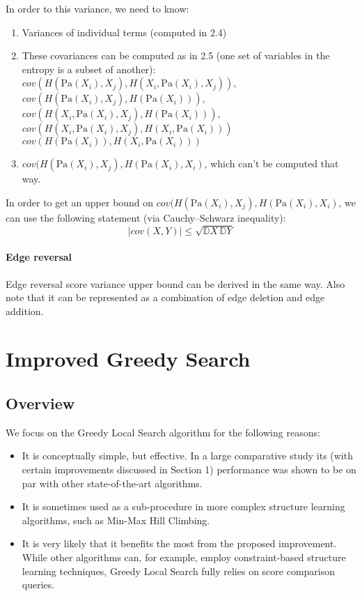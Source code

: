 \documentclass{article}
\begin{document}
In order to this variance, we need to know:
\begin{enumerate}
	\item Variances of individual terms (computed in 2.4)
	\item These covariances can be computed as in 2.5 (one set of variables in the entropy is a subset of another): 
	\\ $cov(H(\textrm{Pa}(X_i), X_j), H(X_i, \textrm{Pa}(X_i), X_j))$, 
	\\ $cov(H(\textrm{Pa}(X_i), X_j),  H(\textrm{Pa}(X_i)))$, 
	\\ $cov(H(X_i, \textrm{Pa}(X_i), X_j), H(\textrm{Pa}(X_i)))$, 
	\\ $cov(H(X_i, \textrm{Pa}(X_i), X_j), H(X_i, \textrm{Pa}(X_i)))$ 
	\\ $cov(H(\textrm{Pa}(X_i)), H(X_i, \textrm{Pa}(X_i)))$
	
	\item $cov(H(\textrm{Pa}(X_i), X_j), H(\textrm{Pa}(X_i), X_i)$, which can't be computed that way.
\end{enumerate}

In order to get an upper bound on $cov(H(\textrm{Pa} (X_i), X_j), H(\textrm{Pa}(X_i), X_i)$, we can use the following statement (via Cauchy–Schwarz inequality):
\begin{equation}
|cov(X, Y)| \le \sqrt{\mathbb{D}X \, \mathbb{D}Y}
\end{equation}

\paragraph{Edge reversal} Edge reversal score variance upper bound can be derived in the same way. Also note that it can be represented as a combination of edge deletion and edge addition.

\section{Improved Greedy Search}
\subsection{Overview}
We focus on the Greedy Local Search algorithm for the following reasons:
\begin{itemize}
	\item It is conceptually simple, but effective. In a large comparative study \cite{MinMaxHillClimbing} its (with certain improvements discussed in Section 1) performance was shown to be on par with other state-of-the-art algorithms.
	\item It is sometimes used as a sub-procedure in more complex structure learning algorithms, such as Min-Max Hill Climbing.
	\item It is very likely that it benefits the most from the proposed improvement. While other algorithms can, for example, employ constraint-based structure learning techniques, Greedy Local Search fully relies on score comparison queries.
\end{itemize}
\end{document}
